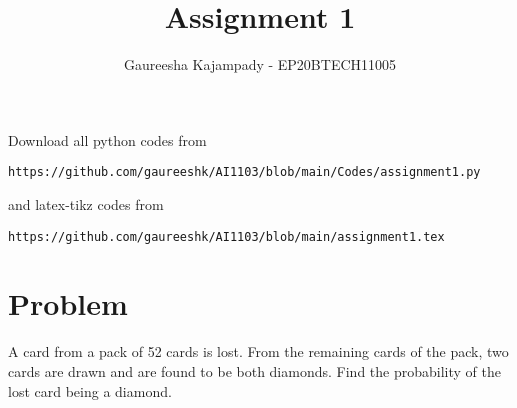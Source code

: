 \documentclass[journal,12pt,twocolumn]{IEEEtran}
\begin{document}
     \def\rightbox#1{\makebox[0in][r]{#1}}
     \def\centbox#1{\makebox[0in]{#1}}
     \def\topbox#1{\raisebox{-\baselineskip}[0in][0in]{#1}}
     \def\midbox#1{\raisebox{-0.5\baselineskip}[0in][0in]{#1}}
\vspace{3cm}
\title{Assignment 1}
\author{Gaureesha Kajampady - EP20BTECH11005}
\maketitle  
\newpage
\bigskip
\renewcommand{\thefigure}{\theenumi}
\renewcommand{\thetable}{\theenumi}
Download all python codes from 
\begin{lstlisting}
https://github.com/gaureeshk/AI1103/blob/main/Codes/assignment1.py
\end{lstlisting}
%
and latex-tikz codes from 
%
\begin{lstlisting}
https://github.com/gaureeshk/AI1103/blob/main/assignment1.tex
\end{lstlisting}
\section{Problem}
 A card from a pack of 52 cards is lost. From
the remaining cards of the pack, two cards
are drawn and are found to be both diamonds.
Find the probability of the lost card being a
diamond.
\end{document}
